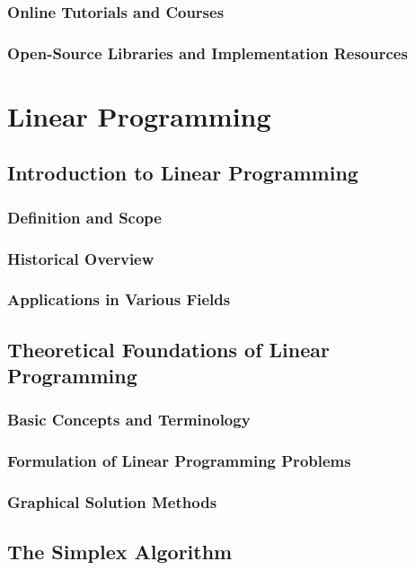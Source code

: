 \documentclass[12pt]{book} %
\begin{document}
\subsection{Online Tutorials and Courses}
\subsection{Open-Source Libraries and Implementation Resources}

\chapter{Linear Programming}

\section{Introduction to Linear Programming}
\subsection{Definition and Scope}
\subsection{Historical Overview}
\subsection{Applications in Various Fields}

\section{Theoretical Foundations of Linear Programming}
\subsection{Basic Concepts and Terminology}
\subsection{Formulation of Linear Programming Problems}
\subsection{Graphical Solution Methods}

\section{The Simplex Algorithm}
\end{document}
